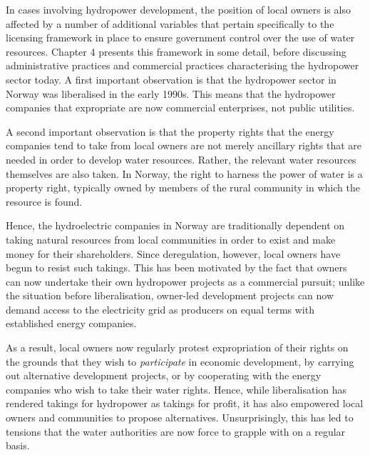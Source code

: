 
In cases involving hydropower development, the position of local owners is also affected by a number of additional variables that pertain specifically to the licensing framework in place to ensure government control over the use of water resources. Chapter 4 presents this framework in some detail, before discussing administrative practices and commercial practices characterising the hydropower sector today. A first important observation is that the hydropower sector in Norway was liberalised in the early 1990s. This means that the hydropower companies that expropriate are now commercial enterprises, not public utilities. 

A second important observation is that the property rights that the energy companies tend to take from local owners are not merely ancillary rights that are needed in order to develop water resources. Rather, the relevant water resources themselves are also taken. In Norway, the right to harness the power of water is a property right, typically owned by members of the rural community in which the resource is found.

Hence, the hydroelectric companies in Norway are traditionally dependent on taking natural resources from local communities in order to exist and make money for their shareholders. Since deregulation, however, local owners have begun to resist such takings. This has been motivated by the fact that owners can now undertake their own hydropower projects as a commercial pursuit; unlike the situation before liberalisation, owner-led development projects can now demand access to the electricity grid as producers on equal terms with established energy companies.

As a result, local owners now regularly protest expropriation of their rights on the grounds that they wish to {\it participate} in economic development, by carrying out alternative development projects, or by cooperating with the energy companies who wish to take their water rights. Hence, while liberalisation has rendered takings for hydropower as takings for profit, it has also empowered local owners and communities to propose alternatives. Unsurprisingly, this has led to tensions that the water authorities are now force to grapple with on a regular basis.

